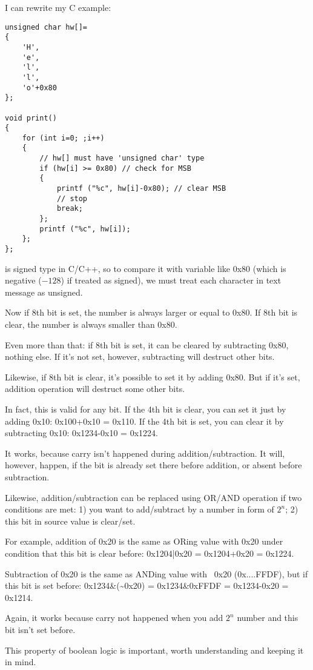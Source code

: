I can rewrite my C example:

\begin{lstlisting}[style=customc]
unsigned char hw[]=
{
	'H',
	'e',
	'l',
	'l',
	'o'+0x80
};

void print()
{
	for (int i=0; ;i++)
	{
		// hw[] must have 'unsigned char' type
		if (hw[i] >= 0x80) // check for MSB
		{
			printf ("%c", hw[i]-0x80); // clear MSB
			// stop
			break;
		};
		printf ("%c", hw[i]);
	};
};
\end{lstlisting}

 is signed type in C/C++, so to compare it with variable like 0x80 (which is negative ($-128$)
if treated as signed),
we must treat each character in text message as unsigned.

Now if 8th bit is set, the number is always larger or equal to 0x80.
If 8th bit is clear, the number is always smaller than 0x80.

Even more than that: if 8th bit is set, it can be cleared by subtracting 0x80, nothing else.
If it's not set, however, subtracting will destruct other bits.

Likewise, if 8th bit is clear, it's possible to set it by adding 0x80.
But if it's set, addition operation will destruct some other bits.

In fact, this is valid for any bit.
If the 4th bit is clear, you can set it just by adding 0x10: 0x100+0x10 = 0x110.
If the 4th bit is set, you can clear it by subtracting 0x10: 0x1234-0x10 = 0x1224.

It works, because carry isn't happened during addition/subtraction.
It will, however, happen, if the bit is already set there before addition, or absent before subtraction.

Likewise, addition/subtraction can be replaced using OR/AND operation if two conditions are met:
1) you want to add/subtract by a number in form of $2^n$;
2) this bit in source value is clear/set.

For example, addition of 0x20 is the same as ORing value with 0x20 under condition that this bit is clear before:
0x1204|0x20 = 0x1204+0x20 = 0x1224.

Subtraction of 0x20 is the same as ANDing value with ~0x20 (0x....FFDF), but if this bit is set before:
0x1234\&(\~{}0x20) = 0x1234\&0xFFDF = 0x1234-0x20 = 0x1214.

Again, it works because carry not happened when you add $2^n$ number and this bit isn't set before.

This property of boolean logic is important, worth understanding and keeping it in mind.

